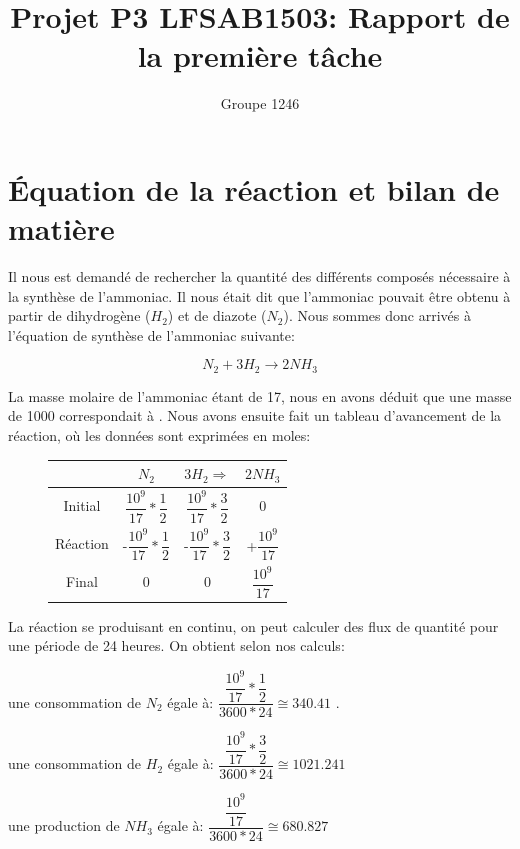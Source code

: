 \documentclass[11pt,a4paper]{report}
\author{Groupe 1246}
\title{Projet P3 LFSAB1503: Rapport de la première tâche}
\begin{document}
\maketitle

\section{Équation de la réaction et bilan de matière}

Il nous est demandé de rechercher la quantité des différents composés nécessaire à la synthèse de l'ammoniac.
Il nous était dit que l'ammoniac pouvait être obtenu à partir de dihydrogène ($H_2$) et de diazote ($N_2$).
Nous sommes donc arrivés à l'équation de synthèse de l'ammoniac suivante: 

$$N_2 + 3H_2 \rightarrow 2NH_3$$

La masse molaire de l'ammoniac étant de \unit{17}{\gram\per\meter}, nous en avons déduit que une masse de \unit{1000}{\ton}
correspondait à \unit{}{\mole}. Nous avons ensuite fait un tableau d'avancement de la réaction,
où les données sont exprimées en moles: 

\begin{figure}[h]
\begin{tabular}{|c|c|c|c|}
\hline 
 & $N_2$ & $3H_2 \Rightarrow$ & $2NH_3$ \\ 
\hline 
Initial & $\dfrac{10^{9}}{17}*\dfrac{1}{2}$ & $\dfrac{10^{9}}{17}*\dfrac{3}{2}$ & 0 \\ 
\hline 
Réaction & -$\dfrac{10^{9}}{17}*\dfrac{1}{2}$ & -$\dfrac{10^{9}}{17}*\dfrac{3}{2}$ & +$\dfrac{10^{9}}{17}$ \\ 
\hline 
Final & 0 & 0 & $\dfrac{10^{9}}{17}$ \\ 
\hline 
\end{tabular} 
\end{figure}

La réaction se produisant en continu, on peut calculer des flux de quantité pour une période de 24 heures.
On obtient selon nos calculs:

\begin{itemize}
  \item{une consommation de $N_2$ égale à: $\dfrac{\dfrac{10^{9}}{17}*\dfrac{1}{2}}{3600*24} \cong 340.41 $ \unit{}{\mole\per\second}.}
  \item{une consommation de $H_2$ égale à: $\dfrac{\dfrac{10^{9}}{17}*\dfrac{3}{2}}{3600*24} \cong 1021.241 $\unit{}{\mole\per\second}
  \item{une production de $NH_3$ égale à: $\dfrac{\dfrac{10^{9}}{17}}{3600*24} \cong 680.827$ \unit{}{\mole\per\second}
}}\end{itemize}
\end{document}
